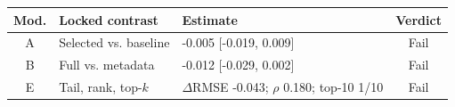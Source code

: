 \begin{tabular}{@{}cp{}p{}c@{}}
\toprule
Mod. & Locked contrast & Estimate & Verdict \\
\midrule
A & Selected vs. baseline & -0.005 [-0.019, 0.009] & Fail \\
B & Full vs. metadata & -0.012 [-0.029, 0.002] & Fail \\
E & Tail, rank, top-$k$ & $\Delta$RMSE -0.043; $\rho$ 0.180; top-10 1/10 & Fail \\
\bottomrule
\end{tabular}
